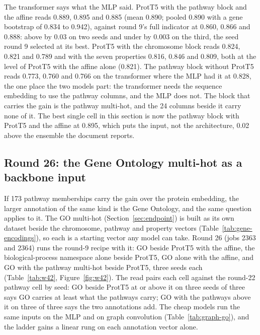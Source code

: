 The transformer says what the MLP said. ProtT5 with the pathway block and the affine
reads 0.889, 0.895 and 0.885 (mean 0.890; pooled 0.890 with a gene bootstrap of 0.834
to 0.942), against round 9's full indicator at 0.860, 0.866 and 0.888: above by 0.03 on
two seeds and under by 0.003 on the third, the seed round 9 selected at its best.
ProtT5 with the chromosome block reads 0.824, 0.821 and 0.789 and with the seven
properties 0.816, 0.846 and 0.809, both at the level of ProtT5 with the affine alone
(0.821). The
pathway block without ProtT5 reads 0.773, 0.760 and 0.766 on the transformer where
the MLP had it at 0.828, the one place the two models part: the transformer needs the
sequence embedding to use the pathway columns, and the MLP does not. The block that
carries the gain is the pathway multi-hot, and the 24 columns beside it carry none of
it. The best single cell in this section is now the pathway block with ProtT5 and the
affine at 0.895, which puts the input, not the architecture, 0.02 above the ensemble
the document reports.

\subsection{Round 26: the Gene Ontology multi-hot as a backbone input}
\label{sec:round26}

If 173 pathway memberships carry the gain over the protein embedding, the larger
annotation of the same kind is the Gene Ontology, and the same question applies to it.
The GO multi-hot (Section~\ref{sec:endpoint}) is built as its own dataset beside the
chromosome, pathway and property vectors (Table~\ref{tab:gene-encodings}), so each is a
starting vector any model can take. Round 26 (jobs 2363 and 2364) runs the round-9
recipe with it: GO beside ProtT5 with the affine, the biological-process namespace
alone beside ProtT5, GO alone with the affine, and GO with the pathway multi-hot beside
ProtT5, three seeds each (Table~\ref{tab:w42}, Figure~\ref{fig:w42}). The read pairs
each cell against the round-22 pathway cell by seed: GO beside ProtT5 at or above it on
three seeds of three says GO carries at least what the pathways carry; GO with the
pathways above it on three of three says the two annotations add. The cheap models run
the same inputs on the MLP and on graph convolution (Table~\ref{tab:graph-go}), and the
ladder gains a linear rung on each annotation vector alone.





